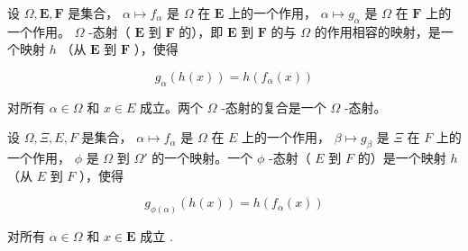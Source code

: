 设 \(\Omega, \mathbf{E}, \mathbf{F}\) 是集合， \(\alpha \mapsto f_{\alpha}\) 是 \(\Omega\) 在 \(\mathbf{E}\) 上的一个作用， \(\alpha \mapsto g_{\alpha}\) 是 \(\Omega\) 在 \(\mathbf{F}\) 上的一个作用。 \(\Omega\) -态射（ \(\mathbf{E}\) 到 \(\mathbf{F}\) 的），即 \(\mathbf{E}\) 到 \(\mathbf{F}\) 的与 \(\Omega\) 的作用相容的映射，是一个映射 \(h\) （从 \(\mathbf{E}\) 到 \(\mathbf{F}\) ），使得

\[
g _ {\alpha} (h (x)) = h \left(f _ {\alpha} (x)\right)
\]

对所有 \(\alpha \in \Omega\) 和 \(x \in E\) 成立。两个 \(\Omega\) -态射的复合是一个 \(\Omega\) -态射。

设 \(\Omega, \Xi, E, F\) 是集合， \(\alpha \mapsto f_{\alpha}\) 是 \(\Omega\) 在 \(E\) 上的一个作用， \(\beta \mapsto g_{\beta}\) 是 \(\Xi\) 在 \(F\) 上的一个作用， \(\phi\) 是 \(\Omega\) 到 \(\Omega'\) 的一个映射。一个 \(\phi\) -态射（ \(E\) 到 \(F\) 的）是一个映射 \(h\) （从 \(E\) 到 \(F\) ），使得

\[
g _ {\phi (\alpha)} (h (x)) = h (f _ {\alpha} (x))
\]

对所有 \(\alpha \in \Omega\) 和 \(x \in \mathbf{E}\) 成立 .


